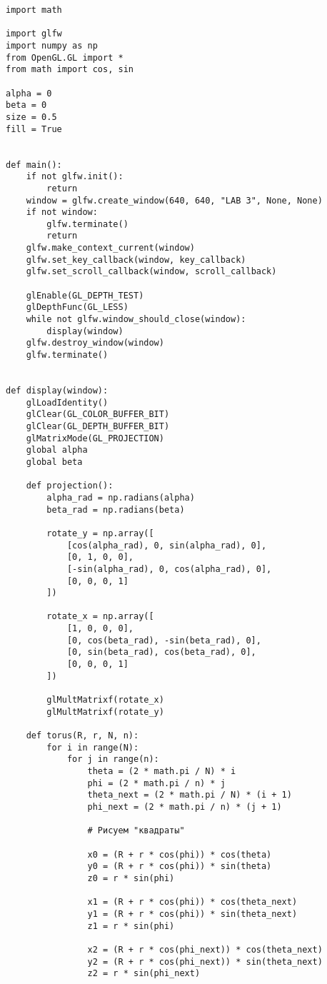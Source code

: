 \documentclass[a4paper, 14pt]{extarticle}
\begin{document}
\begin{lstlisting}
import math

import glfw
import numpy as np
from OpenGL.GL import *
from math import cos, sin

alpha = 0
beta = 0
size = 0.5
fill = True


def main():
    if not glfw.init():
        return
    window = glfw.create_window(640, 640, "LAB 3", None, None)
    if not window:
        glfw.terminate()
        return
    glfw.make_context_current(window)
    glfw.set_key_callback(window, key_callback)
    glfw.set_scroll_callback(window, scroll_callback)

    glEnable(GL_DEPTH_TEST)
    glDepthFunc(GL_LESS)
    while not glfw.window_should_close(window):
        display(window)
    glfw.destroy_window(window)
    glfw.terminate()


def display(window):
    glLoadIdentity()
    glClear(GL_COLOR_BUFFER_BIT)
    glClear(GL_DEPTH_BUFFER_BIT)
    glMatrixMode(GL_PROJECTION)
    global alpha
    global beta

    def projection():
        alpha_rad = np.radians(alpha)
        beta_rad = np.radians(beta)

        rotate_y = np.array([
            [cos(alpha_rad), 0, sin(alpha_rad), 0],
            [0, 1, 0, 0],
            [-sin(alpha_rad), 0, cos(alpha_rad), 0],
            [0, 0, 0, 1]
        ])

        rotate_x = np.array([
            [1, 0, 0, 0],
            [0, cos(beta_rad), -sin(beta_rad), 0],
            [0, sin(beta_rad), cos(beta_rad), 0],
            [0, 0, 0, 1]
        ])

        glMultMatrixf(rotate_x)
        glMultMatrixf(rotate_y)

    def torus(R, r, N, n):
        for i in range(N):
            for j in range(n):
                theta = (2 * math.pi / N) * i
                phi = (2 * math.pi / n) * j
                theta_next = (2 * math.pi / N) * (i + 1)
                phi_next = (2 * math.pi / n) * (j + 1)

                # Рисуем "квадраты"

                x0 = (R + r * cos(phi)) * cos(theta)
                y0 = (R + r * cos(phi)) * sin(theta)
                z0 = r * sin(phi)

                x1 = (R + r * cos(phi)) * cos(theta_next)
                y1 = (R + r * cos(phi)) * sin(theta_next)
                z1 = r * sin(phi)

                x2 = (R + r * cos(phi_next)) * cos(theta_next)
                y2 = (R + r * cos(phi_next)) * sin(theta_next)
                z2 = r * sin(phi_next)


\end{lstlisting}
\end{document}
